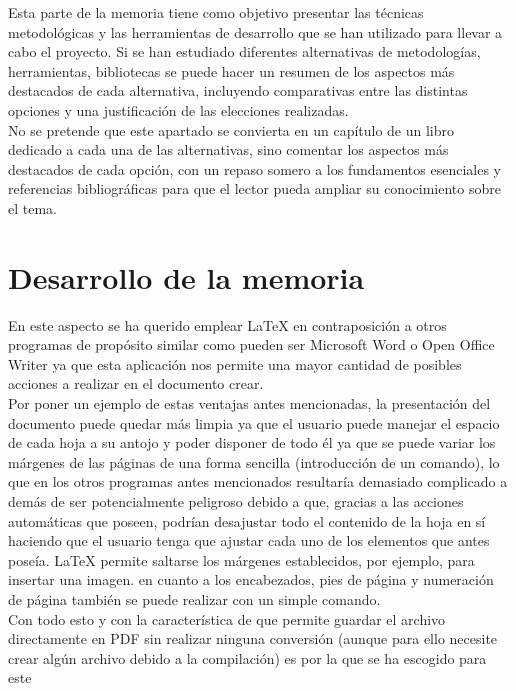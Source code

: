 
Esta parte de la memoria tiene como objetivo presentar las técnicas metodológicas y las herramientas de desarrollo que se han utilizado para llevar a cabo el proyecto. Si se han estudiado diferentes alternativas de metodologías, herramientas, bibliotecas se puede hacer un resumen de los aspectos más destacados de cada alternativa, incluyendo comparativas entre las distintas opciones y una justificación de las elecciones realizadas. \\
No se pretende que este apartado se convierta en un capítulo de un libro dedicado a cada una de las alternativas, sino comentar los aspectos más destacados de cada opción, con un repaso somero a los fundamentos esenciales y referencias bibliográficas para que el lector pueda ampliar su conocimiento sobre el tema.


\section{Desarrollo de la memoria}

En este aspecto se ha querido emplear LaTeX en contraposición a otros programas de propósito similar como pueden ser Microsoft Word o Open Office Writer ya que esta aplicación nos permite una mayor cantidad de posibles acciones a realizar en el documento crear. \\
Por poner un ejemplo de estas ventajas antes mencionadas, la presentación del documento puede quedar más limpia ya que el usuario puede manejar el espacio de cada hoja a su antojo y poder disponer de todo él ya que se puede variar los márgenes de las páginas de una forma sencilla (introducción de un comando), lo que en los otros programas antes mencionados resultaría demasiado complicado a demás de ser potencialmente peligroso debido a que, gracias a las acciones automáticas que poseen, podrían desajustar todo el contenido de la hoja en sí haciendo que el usuario tenga que ajustar cada uno de los elementos que antes poseía. LaTeX permite saltarse los márgenes establecidos, por ejemplo, para insertar una imagen. en cuanto a los encabezados, pies de página y numeración de página también se puede realizar con un simple comando. \\
Con todo esto y con la característica de que permite guardar el archivo directamente en PDF sin realizar ninguna conversión (aunque para ello necesite crear algún archivo debido a la compilación) es por la que se ha escogido para este 

